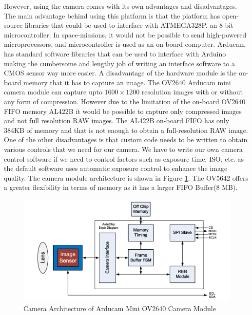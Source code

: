 However, using the camera comes with its own advantages and disadvantages. The main advantage behind using this platform is that the platform has open-source libraries that could be used to interface with ATMEGA328P, an 8-bit microcontroller. In space-missions, it would not be possible to send high-powered microprocessors, and microcontroller is used as an on-board computer. Arducam has standard software libraries that can be used to interface with Arduino making the cumbersome and lengthy job of writing an interface software to a CMOS sensor way more easier.  A disadvantage of the hardware module is the on-board memory that it has to capture an image. The OV2640 Arducam mini camera module can capture upto $1600 \times 1200$ resolution images with or without any form of compression. However due to the limitation of the on-board OV2640 FIFO memory AL422B it would be possible to capture only compressed images and not full resolution RAW images. The AL422B on-board FIFO has only 384KB of memory and that is not enough to obtain a full-resolution RAW image. One of the other disadvantages is that custom code needs to be written to obtain various controls that we need for our camera. We have to write our own camera control software if we need to control factors such as exposure time, ISO, etc. as the default software uses automatic exposure control to enhance the image quality. The camera module architecture is shown in Figure \ref{fig:arducam_arch}. The OV5642 offers a greater flexibility in terms of memory as it has a larger FIFO Buffer(8 MB).

 \begin{figure}[!htbp]
\centering
\includegraphics[scale=0.75]{pics/arducam_architecture}
\caption{Camera Architecture of Arducam Mini OV2640 Camera Module}
\label{fig:arducam_arch}
\end{figure}

